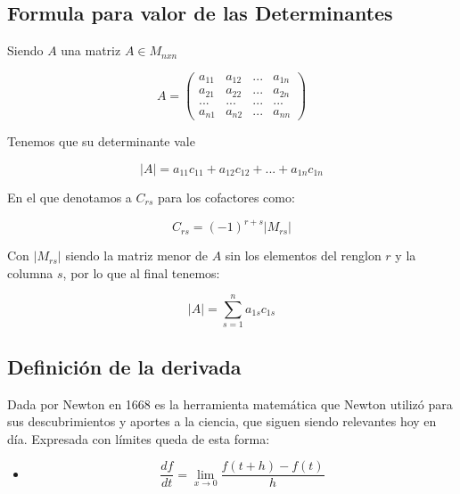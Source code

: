 \documentclass[letterpaper, 12pt]{article}
\begin{document}
\subsection*{Formula para valor de las Determinantes}

Siendo $A$ una matriz $A \in M_{nxn} $

$$A= 
\begin{pmatrix}
a_{11}&a_{12}&...&a_{1n}\\
a_{21}&a_{22}&...&a_{2n}\\
...&...&...&...\\
a_{n1}&a_{n2}&...&a_{nn}
\end{pmatrix}$$

Tenemos que su determinante vale

$$|A|= a_{11}c_{11}+a_{12}c_{12}+...+a_{1n}c_{1n}$$

En el que denotamos a $C_{rs}$ para los cofactores como:

$$ C_{rs}= (-1)^{r+s}|M_{rs}|$$

Con $|M_{rs}|$ siendo la matriz menor de $A$ sin los elementos del renglon $r$ y la columna $s$, por lo que al final tenemos:

$$|A| = \sum_{s=1}^{n} a_{1s}c_{1s}$$

\subsection*{Definición de la derivada}

Dada por Newton en 1668 es la herramienta matemática que Newton utilizó para sus descubrimientos y aportes a la ciencia, que siguen siendo relevantes hoy en día. Expresada con límites queda de esta forma:

\begin{itemize}
    \item[\textcolor{Simbolos}{\diamond}] $$\frac{df}{dt} = \lim\limits_{x\to 0}{\frac{f(t+h)-f(t)}{h}}$$
\end{itemize}
\end{document}
